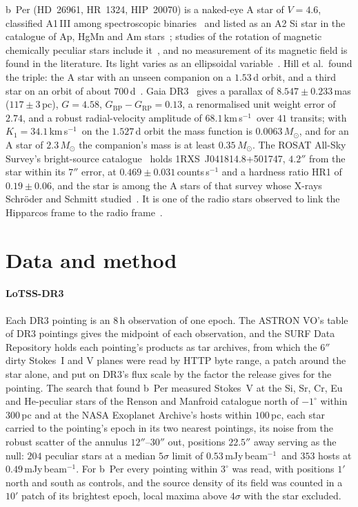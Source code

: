 \documentclass[3p,11pt]{elsarticle}
\newcommand{\kms}{km\,s$^{-1}$}
\newcommand{\mJyb}{mJy\,beam$^{-1}$}
\newcommand{\Msun}{M_\odot}
\begin{document}
b~Per (HD~26961, HR~1324, HIP~20070) is a naked-eye A star of $V=4.6$, classified
A1\,III among spectroscopic binaries~\cite{Abt2009} and listed as an A2 Si star in the
catalogue of Ap, HgMn and Am stars~\cite{RensonManfroid2009}; studies of the rotation of
magnetic chemically peculiar stars include it~\cite{Netopil2017,Bernhard2020}, and no
measurement of its magnetic field is found in the literature. Its light varies as an
ellipsoidal variable~\cite{Stebbins1923}. Hill et al.\ found the triple: the A star with
an unseen companion on a $1.53$\,d orbit, and a third star on an orbit of about
$700$\,d~\cite{Hill1976}. Gaia DR3~\cite{Gaia2023} gives a parallax of
$8.547\pm0.233$\,mas ($117\pm3$\,pc), $G=4.58$, $G_\mathrm{BP}-G_\mathrm{RP}=0.13$, a
renormalised unit weight error of $2.74$, and a robust radial-velocity amplitude of
$68.1$\,\kms\ over $41$ transits; with $K_1=34.1$\,\kms\ on the $1.527$\,d orbit the mass
function is $0.0063\,\Msun$, and for an A star of $2.3\,\Msun$ the companion's mass is at
least $0.35\,\Msun$. The ROSAT All-Sky Survey's bright-source catalogue~\cite{Voges1999}
holds 1RXS~J041814.8+501747, $4.2''$ from the star within its $7''$ error, at
$0.469\pm0.031$\,counts\,s$^{-1}$ and a hardness ratio HR1 of $0.19\pm0.06$, and the star
is among the A stars of that survey whose X-rays Schr\"oder and Schmitt
studied~\cite{SchroderSchmitt2007}. It is one of the radio stars observed to link the
Hipparcos frame to the radio frame~\cite{Walter1997}.

\section{Data and method}\label{sec:method}

\paragraph{LoTSS-DR3} Each DR3 pointing is an $8$\,h observation of one epoch. The
ASTRON VO's table of DR3 pointings gives the midpoint of each observation, and the SURF
Data Repository holds each pointing's products as tar archives, from which the $6''$
dirty Stokes~I and V planes were read by HTTP byte range, a patch around the star alone,
and put on DR3's flux scale by the factor the release gives for the pointing. The search
that found b~Per measured Stokes~V at the Si, Sr, Cr, Eu and He-peculiar stars of the
Renson and Manfroid catalogue north of $-1^\circ$ within $300$\,pc and at the NASA
Exoplanet Archive's hosts within $100$\,pc, each star carried to the pointing's epoch in
its two nearest pointings, its noise from the robust scatter of the annulus $12''$--$30''$
out, positions $22.5''$ away serving as the null: $204$ peculiar stars at a median
$5\sigma$ limit of $0.53$\,\mJyb\ and $353$ hosts at $0.49$\,\mJyb. For b~Per every
pointing within $3^\circ$ was read, with positions $1'$ north and south as controls, and
the source density of its field was counted in a $10'$ patch of its brightest epoch,
local maxima above $4\sigma$ with the star excluded.
\end{document}
